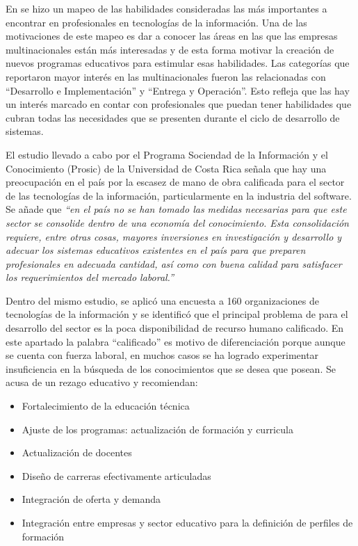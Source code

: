 En \cite{murillo-trejos} se hizo un mapeo de las habilidades consideradas las más importantes a encontrar en profesionales en tecnologías de la información. Una de las motivaciones de este mapeo es dar a conocer las áreas en las que las empresas multinacionales están más interesadas y de esta forma motivar la creación de nuevos programas educativos para estimular esas habilidades. Las categorías que reportaron mayor interés en las multinacionales fueron las relacionadas con ``Desarrollo e Implementación'' y ``Entrega y Operación''. Esto refleja que las hay un interés marcado en contar con profesionales que puedan tener habilidades que cubran todas las necesidades que se presenten durante el ciclo de desarrollo de sistemas.


El estudio llevado a cabo por el Programa Sociendad de la Información y el Conocimiento \cite{prosic}(Prosic) de la Universidad de Costa Rica señala que hay una preocupación en el país por la escasez de mano de obra calificada para el sector de las tecnologías de la información, particularmente en la industria del software. Se añade que \emph{``en el país no se han tomado las medidas necesarias para que este sector se consolide dentro de una economía del conocimiento. Esta consolidación requiere, entre otras cosas, mayores inversiones en investigación y desarrollo y
adecuar los sistemas educativos existentes en el país para que preparen profesionales en adecuada cantidad, así como con buena calidad para satisfacer los requerimientos del mercado laboral.''}

Dentro del mismo estudio, se aplicó una encuesta a 160 organizaciones de tecnologías de la información y se identificó que el principal problema de para el desarrollo del sector es la poca disponibilidad de recurso humano calificado. En este apartado la palabra ``calificado'' es motivo de diferenciación porque aunque se cuenta con fuerza laboral, en muchos casos se ha logrado experimentar insuficiencia en la búsqueda de los conocimientos que se desea que posean. Se acusa de un rezago educativo y recomiendan:
\begin{itemize}
    \item Fortalecimiento de la educación técnica
    \item Ajuste de los programas: actualización de formación y curricula
    \item Actualización de docentes
    \item Diseño de carreras efectivamente articuladas
    \item Integración de oferta y demanda
    \item Integración entre empresas y sector educativo para la definición de perfiles de formación
\end{itemize}


